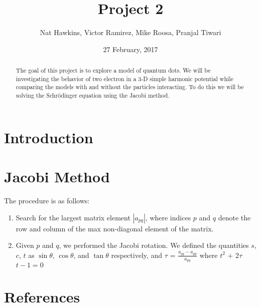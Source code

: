 \documentclass{article}
\title{Project 2}
\author{Nat Hawkins, Victor Ramirez, Mike Roosa, Pranjal Tiwari}
\date{27 February, 2017}
\begin{document}
\maketitle

\begin{abstract}
	The goal of this project is to explore a model of quantum dots. We will be investigating the behavior of two electron in a 3-D simple harmonic potential while comparing the models with and without the particles interacting. To do this we will be solving the Schrödinger equation using the Jacobi method. 
\end{abstract}
\section{Introduction}

\section{Jacobi Method}

The procedure is as follows:

\begin{enumerate}
	\item Search for the largest matrix element $|a_{pq}|$, where indices $p$ and $q$ denote the row and column of the max non-diagonal element of the matrix.
	\item Given $p$ and $q$, we performed the Jacobi rotation. We defined the quantities
	$s$, $c$, $t$ as $\sin\theta$, $\cos\theta$, and $\tan\theta$ respectively, and  
	$\tau$ =  $ \frac{a_{qq} - a_{pp}}{a_{pq}} $
	where $t^{2}$ $+$ 2$\tau$ $t - 1 = 0$ 
	
	
\end{enumerate}
\section{References}

\end{document}
